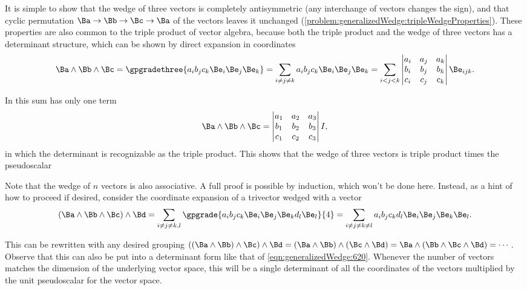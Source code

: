 It is simple to show that the wedge of three vectors is completely antisymmetric (any interchange of vectors changes the sign), and that cyclic permutation \( \Ba \rightarrow \Bb \rightarrow \Bc \rightarrow \Ba \) of the vectors leaves it unchanged
(\cref{problem:generalizedWedge:tripleWedgeProperties}).
These properties are also common to the triple product of  vector algebra, because both the triple product and the wedge of three vectors has a determinant structure,
which can be shown by direct expansion in coordinates
\begin{dmath}\label{eqn:generalizedWedge:620}
\Ba \wedge \Bb \wedge \Bc
=
\gpgradethree{ a_i b_j c_k \Be_i \Be_j \Be_k }
=
\sum_{i \ne j \ne k}
a_i b_j c_k \Be_i \Be_j \Be_k
=
\sum_{i < j < k}
\begin{vmatrix}
a_i & a_j & a_k \\
b_i & b_j & b_k \\
c_i & c_j & c_k \\
\end{vmatrix}
\Be_{i j k}.
\end{dmath}

In  this sum has only one term
\begin{equation}\label{eqn:generalizedWedge:680}
\Ba \wedge \Bb \wedge \Bc
=
\begin{vmatrix}
a_1 & a_2 & a_3 \\
b_1 & b_2 & b_3 \\
c_1 & c_2 & c_3 \\
\end{vmatrix}
I,
\end{equation}
in which the determinant is recognizable as the triple product.  This shows that the  wedge of three vectors is triple product times the pseudoscalar

Note that the wedge of \( n \) vectors is also associative.
A full proof is possible by induction, which won't be done here.
Instead, as a hint of how to proceed if desired,
consider the coordinate expansion of a trivector wedged with a vector
\begin{dmath}\label{eqn:generalizedWedge:660}
(\Ba \wedge \Bb \wedge \Bc) \wedge \Bd
=
\sum_{i \ne j \ne k, l}
\gpgrade{
a_i b_j c_k
\Be_i \Be_j \Be_k
d_l \Be_l
}{4}
=
\sum_{i \ne j \ne k \ne l}
a_i b_j c_k d_l
\Be_i \Be_j \Be_k \Be_l.
\end{dmath}

This can be rewritten with any desired grouping \( ((\Ba \wedge \Bb) \wedge \Bc) \wedge \Bd = (\Ba \wedge \Bb) \wedge ( \Bc \wedge \Bd) = \Ba \wedge (\Bb \wedge \Bc \wedge \Bd) = \cdots \).
Observe that this can also be put into a determinant form like that of
\cref{eqn:generalizedWedge:620}.
Whenever the number of vectors matches the dimension of the underlying vector space, this will be a single determinant of all the coordinates of the vectors multiplied by the unit pseudoscalar for the vector space.

